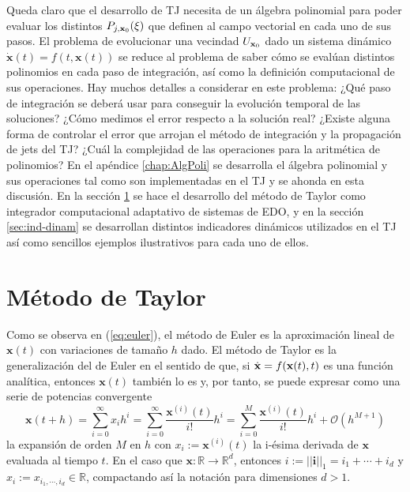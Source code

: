 Queda claro que el desarrollo de TJ necesita de un álgebra polinomial para poder evaluar los distintos $P_{j,\mathbf{x}_0}(\xi)$ que definen al campo vectorial en cada uno de sus pasos. El problema de evolucionar una vecindad $U_{\mathbf{x}_0}$ dado un sistema dinámico $\dot{\mathbf{x}}(t) = f(t,\mathbf{x}(t))$ se reduce al problema de saber cómo se evalúan distintos polinomios en cada paso de integración, así como la definición computacional de sus operaciones. Hay muchos detalles a considerar en este problema: ¿Qué paso de integración se deberá usar para conseguir la evolución temporal de las soluciones? ¿Cómo medimos el error respecto a la solución real? ¿Existe alguna forma de controlar el error que arrojan el método de integración y la propagación de jets del TJ? ¿Cuál la complejidad de las operaciones para la aritmética de polinomios? En el apéndice \ref{chap:AlgPoli} se desarrolla el álgebra polinomial y sus operaciones tal como son implementadas en el TJ y se ahonda en esta discusión. En la sección \ref{sec:taylor-metodo} se hace el desarrollo del método de Taylor como integrador computacional adaptativo de sistemas de EDO, y en la sección \ref{sec:ind-dinam} se desarrollan distintos indicadores dinámicos utilizados en el TJ así como sencillos ejemplos ilustrativos para cada uno de ellos.

\section{Método de Taylor}
\label{sec:taylor-metodo}

Como se observa en (\ref{eq:euler}), el método de Euler es la aproximación lineal de $\mathbf{x}(t)$ con variaciones de tamaño $h$ dado. El método de Taylor es la generalización del de Euler en el sentido de que, si $\dot{\mathbf{x}} = f(\mathbf{x}(t),t)$ es una función analítica, entonces $\mathbf{x}(t)$ también lo es y, por tanto, se puede expresar como una serie de potencias convergente 
\begin{equation}
\mathbf{x}(t + h) = \sum_{i=0}^\infty x_i h^i = \sum_{i=0}^\infty \frac{\mathbf{x}^{(i)}(t)}{i!}h^i 
= \sum_{i=0}^M \frac{\mathbf{x}^{(i)}(t)}{i!}h^i + \mathcal{O}(h^{M+1})
\label{eq:anal-exp}
\end{equation}
la expansión de orden $M$ en $h$ con $x_i := \mathbf{x}^{(i)}(t)$ la i-ésima derivada de $\mathbf{x}$ evaluada al tiempo $t$. En el caso que $\mathbf{x}: \mathbb{R} \to \mathbb{R}^d$, entonces $i := ||\mathbf{i}||_1 = i_1 + \cdots + i_d$ y $x_i := x_{i_1,\cdots,i_d} \in \mathbb{R}$, compactando así la notación para dimensiones $d > 1$.

